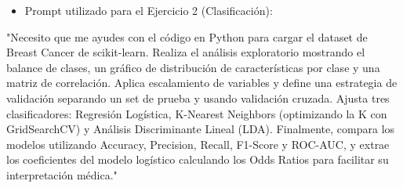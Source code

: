 \documentclass[11pt,spanish]{article}
\begin{document}
\begin{itemize}
    \item Prompt utilizado para el Ejercicio 2 (Clasificación):
\end{itemize}

"Necesito que me ayudes con el código en Python para cargar el dataset de Breast Cancer de scikit-learn. Realiza el análisis exploratorio mostrando el balance de clases, un gráfico de distribución de características por clase y una matriz de correlación. Aplica escalamiento de variables y define una estrategia de validación separando un set de prueba y usando validación cruzada. Ajusta tres clasificadores: Regresión Logística, K-Nearest Neighbors (optimizando la K con GridSearchCV) y Análisis Discriminante Lineal (LDA). Finalmente, compara los modelos utilizando Accuracy, Precision, Recall, F1-Score y ROC-AUC, y extrae los coeficientes del modelo logístico calculando los Odds Ratios para facilitar su interpretación médica."
\end{document}
